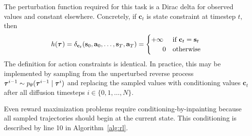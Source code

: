The perturbation function required for this task is a Dirac delta for observed values and constant elsewhere.
Concretely, if $\mathbf{c}_t$ is state constraint at timestep $t$, then
\[
    h(\bm{\tau}^{}) = \delta_{\mathbf{c}_t}(\mathbf{s}_0,\mathbf{a}_0,\ldots,\mathbf{s}_T,\mathbf{a}_T) =
\begin{cases}
    +\infty      & \text{if } \mathbf{c}_t = \mathbf{s}_t\\
    ~~~~~0      & \text{otherwise}
\end{cases}
\]
The definition for action constraints is identical.
In practice, this may be implemented by sampling from the unperturbed reverse process ${\bm{\tau}^{i-1} \sim p_\theta(\bm{\tau}^{i-1} \mid \bm{\tau}^{i})}$ and replacing the sampled values with conditioning values $\mathbf{c}_t$ after all diffusion timesteps $i \in \{0, 1, \ldots, N\}$.

Even reward maximization problems require conditioning-by-inpainting because all sampled trajectories should begin at the current state.
This conditioning is described by line 10 in Algorithm~\ref{alg:rl}.
